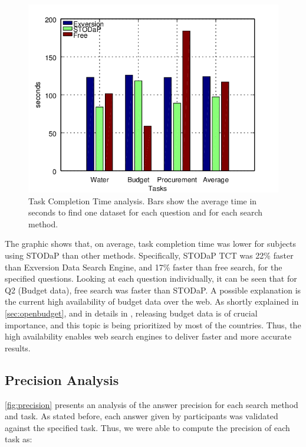 \begin{figure}[h!]
\begin{center}
\includegraphics[width=\columnwidth]{images/tct.png}
\caption[Task Completion Time analysis.]{Task Completion Time analysis. Bars show the average time in seconds to find one dataset for each question and for each search method.}
\label{fig:tct}
\end{center}
\end{figure}

The graphic shows that, on average, task completion time was lower for subjects using STODaP than other methods.
Specifically, STODaP TCT was 22\% faster than Exversion Data Search Engine, and 17\% faster than free search, for the specified questions.
Looking at each question individually, it can be seen that for Q2 (Budget data), free search was faster than STODaP.
A possible explanation is the current high availability of budget data over the web.
As shortly explained in \autoref{sec:openbudget}, and in details in , releasing budget data is of crucial importance, and this topic is being prioritized by most of the countries.
Thus, the high availability enables web search engines to deliver faster and more accurate results.


\subsection{Precision Analysis}

\autoref{fig:precision} presents an analysis of the answer precision for each search method and task.
As stated before, each answer given by participants was validated against the specified task.
Thus, we were able to compute the precision of each task as:

